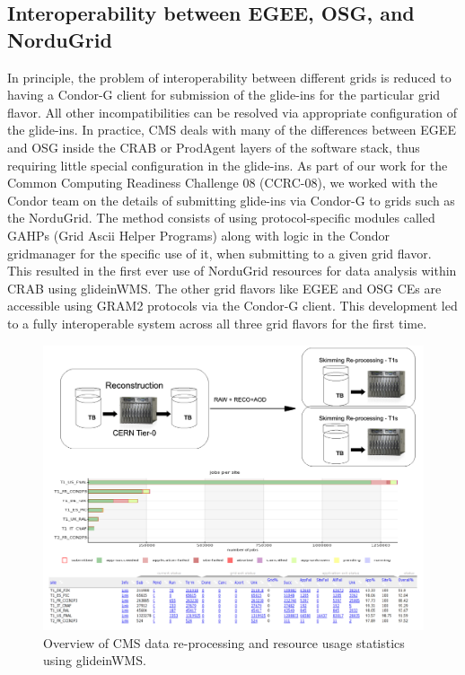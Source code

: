 \documentclass[a4paper]{jpconf}
\begin{document}
\subsection {Interoperability between EGEE, OSG, and NorduGrid}
In principle, the problem of interoperability between different grids is reduced to having a Condor-G client
for submission of the glide-ins for the particular grid flavor. All other incompatibilities can be 
resolved via appropriate configuration of the glide-ins. In practice, CMS deals with many of the differences 
between EGEE and OSG inside the CRAB or ProdAgent layers of the software stack, thus requiring little special 
configuration in the glide-ins. As part of our work for the Common Computing Readiness Challenge 08 (CCRC-08), we worked 
with the Condor team on the details of submitting glide-ins via Condor-G to grids such as the NorduGrid. The method 
consists of using protocol-specific modules called GAHPs (Grid Ascii Helper Programs) along with logic in the Condor gridmanager for the 
specific use of it, when submitting to a given grid flavor. This resulted 
in the first ever use of NorduGrid resources for data analysis within CRAB using glideinWMS. The other grid flavors like 
EGEE and OSG CEs are accessible using GRAM2 protocols via the Condor-G client. This development led to
a fully interoperable system across all three grid flavors for the first time.
\begin{figure}
\begin{center}
\includegraphics[scale=0.5]{DataReprocess}
\end{center}
\caption{Overview of CMS data re-processing and resource usage statistics using glideinWMS.}
\label{fig:reprocessT1s}
\end{figure}
\end{document}
